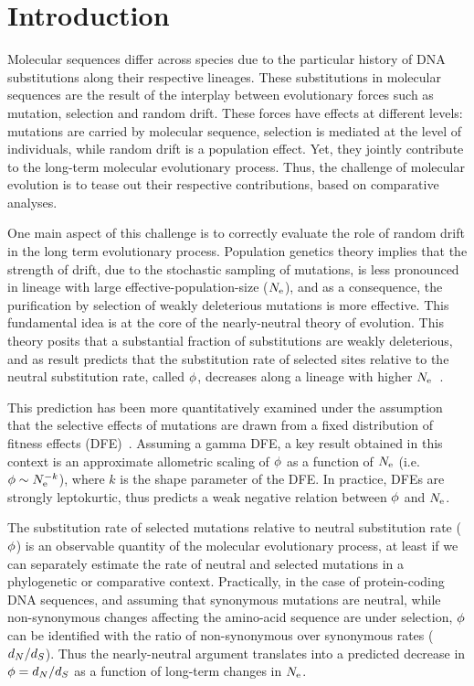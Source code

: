 \section{Introduction}
Molecular sequences differ across species due to the particular history of \acrshort{DNA} \glspl{substitution} along their respective lineages.
These \glspl{substitution} in molecular sequences are the result of the interplay between evolutionary forces such as mutation, selection and random \gls{drift}.
These forces have effects at different levels: mutations are carried by molecular sequence, selection is mediated at the level of individuals, while random \gls{drift} is a population effect.
Yet, they jointly contribute to the long-term molecular evolutionary process.
Thus, the challenge of molecular evolution is to tease out their respective contributions, based on comparative analyses.

One main aspect of this challenge is to correctly evaluate the role of random drift in the long term evolutionary process.
Population genetics theory implies that the strength of drift, due to the stochastic sampling of mutations, is less pronounced in lineage with large \gls{effective-population-size} ($N_{\mathrm{e}}$), and as a consequence, the purification by selection of weakly deleterious mutations is more effective.
This fundamental idea is at the core of the \gls{nearly-neutral} theory of evolution.
This theory posits that a substantial fraction of \glspl{substitution} are weakly deleterious, and as result predicts that the \gls{substitution} rate of selected sites relative to the \gls{neutral} \gls{substitution} rate, called $\phi$, decreases along a lineage with higher $N_{\mathrm{e}}$~\citep{Ohta1972, Ohta1992}.

This prediction has been more quantitatively examined under the assumption that the selective effects of mutations are drawn from a fixed distribution of fitness effects (\acrshort{DFE})~\citep{Kimura1979, Welch2008}.
Assuming a gamma \acrshort{DFE}, a key result obtained in this context is an approximate allometric scaling of $\phi$ as a function of $N_{\mathrm{e}}$ (i.e. $\phi \sim N_{\mathrm{e}}^{-k}$), where $k$ is the shape parameter of the \acrshort{DFE}.
In practice, DFEs are strongly leptokurtic, thus predicts a weak negative relation between $\phi$ and $N_{\mathrm{e}}$.

The \gls{substitution} rate of selected mutations relative to \gls{neutral} \gls{substitution} rate ($\phi$) is an observable quantity of the molecular evolutionary process, at least if we can separately estimate the rate of \gls{neutral} and selected mutations in a phylogenetic or comparative context.
Practically, in the case of protein-coding \acrshort{DNA} sequences, and assuming that synonymous mutations are \gls{neutral}, while non-synonymous changes affecting the amino-acid sequence are under selection, $\phi$ can be identified with the ratio of non-synonymous over \gls{synonymous} rates ($d_N / d_S$).
Thus the \gls{nearly-neutral} argument translates into a predicted decrease in $\phi = d_N / d_S$ as a function of long-term changes in $N_{\mathrm{e}}$.

